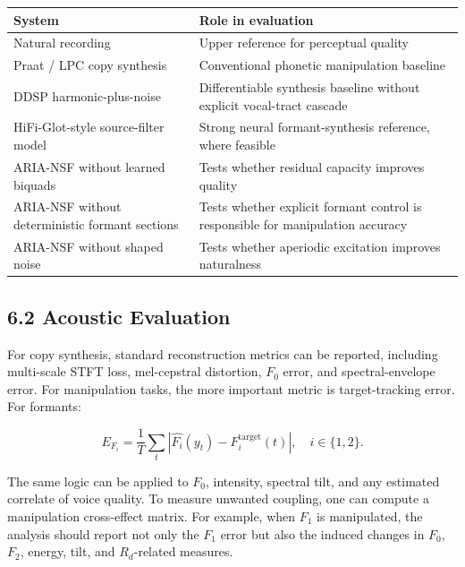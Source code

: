 {\def\LTcaptype{none} %
\begin{longtable}[]{@{}
  >{\raggedright\arraybackslash}p{}
  >{\raggedright\arraybackslash}p{}@{}}
\toprule\noalign{}
\begin{minipage}[b]{\linewidth}\raggedright
System
\end{minipage} & \begin{minipage}[b]{\linewidth}\raggedright
Role in evaluation
\end{minipage} \\
\midrule\noalign{}
\endhead
\bottomrule\noalign{}
\endlastfoot
Natural recording & Upper reference for perceptual quality \\
Praat / LPC copy synthesis & Conventional phonetic manipulation
baseline \\
DDSP harmonic-plus-noise & Differentiable synthesis baseline without
explicit vocal-tract cascade \\
HiFi-Glot-style source-filter model & Strong neural formant-synthesis
reference, where feasible \\
ARIA-NSF without learned biquads & Tests whether residual capacity
improves quality \\
ARIA-NSF without deterministic formant sections & Tests whether explicit
formant control is responsible for manipulation accuracy \\
ARIA-NSF without shaped noise & Tests whether aperiodic excitation
improves naturalness \\
\end{longtable}
}

\subsection{6.2 Acoustic Evaluation}\label{acoustic-evaluation}

For copy synthesis, standard reconstruction metrics can be reported,
including multi-scale STFT loss, mel-cepstral distortion, \(F_0\) error,
and spectral-envelope error. For manipulation tasks, the more important
metric is target-tracking error. For formants:

\[
E_{F_i}
=
\frac{1}{T}
\sum_t
\left|
\widehat{F_i}(y_t)-F_i^{\mathrm{target}}(t)
\right|,
\quad i\in\{1,2\}.
\]

The same logic can be applied to \(F_0\), intensity, spectral tilt, and
any estimated correlate of voice quality. To measure unwanted coupling,
one can compute a manipulation cross-effect matrix. For example, when
\(F_1\) is manipulated, the analysis should report not only the \(F_1\)
error but also the induced changes in \(F_0\), \(F_2\), energy, tilt,
and \(R_d\)-related measures.


